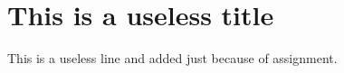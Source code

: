 \documentclass{article}
\begin{document}
\section*{This is a useless title}
This is a useless line and added just because of assignment.
\end{document}
